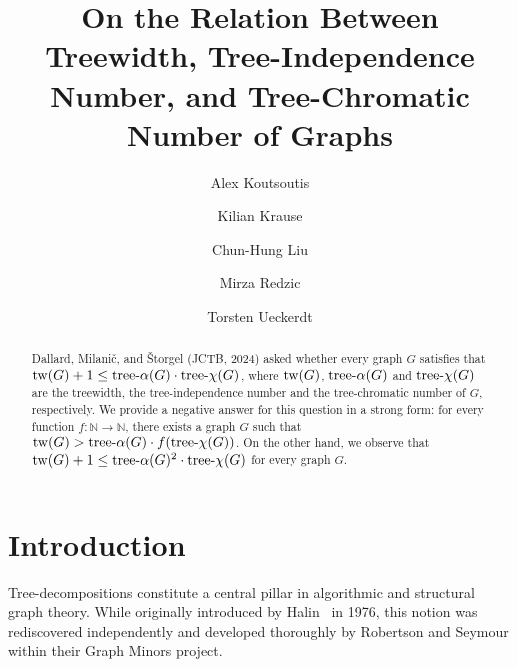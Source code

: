 \documentclass[a4paper, cleveref, autoref, thm-restate]{lipics-v2021}
\title{On the Relation Between Treewidth, Tree-Independence Number, and Tree-Chromatic Number of Graphs}
\author{Alex Koutsoutis}{Texas A\&M University, USA}{akoutsoutis@tamu.edu}{}{}
\author{Kilian Krause}{Karlsruhe Institute of Technology, Germany}{KilianKrause@outlook.de}{}{}
\author{Chun-Hung Liu}{Texas A\&M University, USA}{chliu@tamu.edu}{}{Partially supported by NSF under CAREER award DMS-2144042.}
\author{Mirza Redzic}{Karlsruhe Institute of Technology, Germany}{mirza.redzic}{https://orcid.org/0009-0001-7509-1686}
{supported by the Deutsche Forschungsgemeinschaft (DFG, German Research Foundation) -- 462679611.}
\author{Torsten Ueckerdt}{Karlsruhe Institute of Technology, Germany}{torsten.ueckerdt@kit.edu}{https://orcid.org/0000-0002-0645-9715}{supported by the Deutsche Forschungsgemeinschaft (DFG, German Research Foundation) -- 532213793.}
\newcommand{\twG}{{\rm tw}(G)}
\newcommand{\tw}{{\rm tw}}
\newcommand{\treeaG}{{\rm tree\textnormal{-}}\alpha(G)}
\newcommand{\treea}{{\rm tree}\textnormal{-}\alpha}
\newcommand{\treex}{{\rm tree}\textnormal{-}\chi}
\newcommand{\treexG}{{\rm tree\textnormal{-}}\chi(G)}
\begin{document}
\maketitle

\begin{abstract}
Dallard, Milani\v{c}, and \v{S}torgel (JCTB, 2024) asked whether every graph $G$ satisfies that $\twG+1 \leq \treeaG \cdot \treexG$, where $\tw(G)$, $\treea(G)$ and $\treex(G)$ are the treewidth, the tree-independence number and the tree-chromatic number of $G$, respectively.
We provide a negative answer for this question in a strong form: for every function $f\colon {\mathbb N} \rightarrow {\mathbb N}$, there exists a graph $G$ such that $\tw(G) > \treea(G) \cdot f(\treex(G))$.
On the other hand, we observe that $\tw(G)+1 \leq \treea(G)^2 \cdot \treex(G)$ for every graph $G$.
%
%    
%
\end{abstract}
%

\section{Introduction}
\label{sec:introduction}

Tree-decompositions constitute a central pillar in algorithmic and structural graph theory.
While originally introduced by Halin~\cite{Hal-76} in 1976, this notion was rediscovered independently and developed thoroughly by Robertson and Seymour within their Graph Minors project. %
\end{document}
